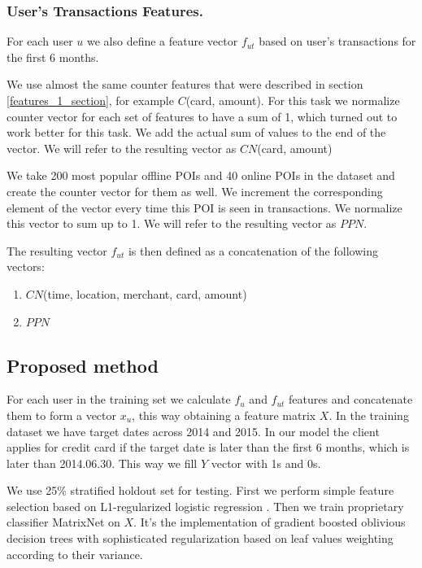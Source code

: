 \documentclass{llncs}
\begin{document}
	\subsubsection{User's Transactions Features.}
	For each user $u$ we also define a feature vector $f_{ut}$ based on user's transactions for the first 6 months.
	
	We use almost the same counter features that were described in section \ref{features_1_section}, for example $C$(card, amount). For this task we normalize counter vector for each set of features to have a sum of 1, which turned out to work better for this task. We add the actual sum of values to the end of the vector. We will refer to the resulting vector as $CN$(card, amount)
	
	We take 200 most popular offline POIs and 40 online POIs in the dataset and create the counter vector for them as well. We increment the corresponding element of the vector every time this POI is seen in transactions. We normalize this vector to sum up to 1. We will refer to the resulting vector as $PPN$.
	
	The resulting vector $f_{ut}$ is then defined as a concatenation of the following vectors:
	\begin{enumerate}
		\item $CN$(time, location, merchant, card, amount)
		\item $PPN$
	\end{enumerate}
	
	\subsection{Proposed method}
	
	For each user in the training set we calculate $f_u$ and $f_{ut}$ features and concatenate them to form a vector $x_u$, this way obtaining a feature matrix $X$. In the training dataset we have target dates across 2014 and 2015. In our model the client applies for credit card if the target date is later than the first 6 months, which is later than 2014.06.30. This way we fill $Y$ vector with 1s and 0s.
	
	We use 25\% stratified holdout set for testing. First we perform simple feature selection based on L1-regularized logistic regression \cite{tbl}. Then we train proprietary classifier MatrixNet on $X$. It's the implementation of gradient boosted oblivious decision trees \cite{oblivious} with sophisticated regularization based on leaf values weighting according to their variance.
	
\end{document}
